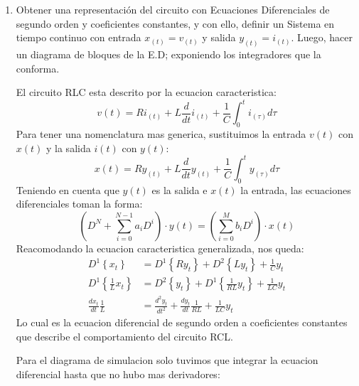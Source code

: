 \documentclass[12pt,a4paper]{report}
\begin{document}
  \begin{enumerate}[label=\alph*)]
  \item Obtener una representación del circuito con Ecuaciones Diferenciales de segundo orden y coeficientes constantes,
    y con ello, definir un Sistema en tiempo continuo con entrada $x_{(t)} = v_{(t)}$ y salida $y_{(t)} = i_{(t)}$. Luego,
    hacer un diagrama de bloques de la E.D; exponiendo los integradores que la conforma.
    
    El circuito RLC esta descrito por la ecuacion caracteristica:
    \begin{equation*}
      v(t) = Ri_{(t)} + L \frac{d}{dt} i_{(t)} + \frac{1}{C} \int_{0}^{t} i_{(\tau)} d\tau
    \end{equation*}
    Para tener una nomenclatura mas generica, sustituimos la entrada $v(t)$ con $x(t)$ y la salida $i(t)$ con $y(t)$:
    \begin{equation*}
      x(t) = Ry_{(t)} + L \frac{d}{dt} y_{(t)} + \frac{1}{C} \int_{0}^{t} y_{(\tau)} d\tau
    \end{equation*}
    Teniendo en cuenta que $y(t)$ es la salida e $x(t)$ la entrada, las ecuaciones diferenciales toman la forma:
    \begin{equation*}
      \left(D^N + \sum_{i=0}^{N-1} a_i D^i\right) \cdot y(t) = \left(\sum_{i=0}^{M} b_i D^i\right) \cdot x(t)
    \end{equation*}
    Reacomodando la ecuacion caracteristica generalizada, nos queda:
    \begin{align*}
      D^1\left\{x_t\right\} &= D^1\left\{R y_t\right\} + D^2\left\{L y_t\right\} + \frac{1}{C} y_t\\
      D^1\left\{\frac{1}{L} x_t\right\} &= D^2\left\{y_t\right\} + D^1\left\{\frac{1}{RL} y_t\right\} + \frac{1}{LC} y_t\\
      \frac{dx_t}{dt} \frac{1}{L} &= \frac{d^2 y_t}{dt^2} + \frac{dy_t}{dt} \frac{1}{RL} + \frac{1}{LC} y_t
    \end{align*}
    Lo cual es la ecuacion diferencial de segundo orden a coeficientes constantes que describe el comportamiento
    del circuito RCL.

    Para el diagrama de simulacion solo tuvimos que integrar la ecuacion diferencial hasta que no hubo mas derivadores:
      
    \begin{figure}[h]
      \centering
\end{figure}
\end{enumerate}
\end{document}
